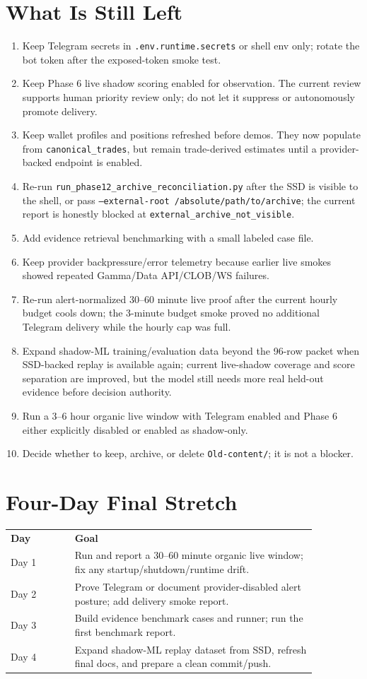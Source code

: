 \documentclass{article}
\begin{document}
\section*{What Is Still Left}
\begin{enumerate}[nosep]
\item Keep Telegram secrets in \texttt{.env.runtime.secrets} or shell env only; rotate the bot token after the exposed-token smoke test.
\item Keep Phase 6 live shadow scoring enabled for observation. The current review supports human priority review only; do not let it suppress or autonomously promote delivery.
\item Keep wallet profiles and positions refreshed before demos. They now populate from \texttt{canonical\_trades}, but remain trade-derived estimates until a provider-backed endpoint is enabled.
\item Re-run \texttt{run\_phase12\_archive\_reconciliation.py} after the SSD is visible to the shell, or pass \texttt{--external-root /absolute/path/to/archive}; the current report is honestly blocked at \texttt{external\_archive\_not\_visible}.
\item Add evidence retrieval benchmarking with a small labeled case file.
\item Keep provider backpressure/error telemetry because earlier live smokes showed repeated Gamma/Data API/CLOB/WS failures.
\item Re-run alert-normalized 30--60 minute live proof after the current hourly budget cools down; the 3-minute budget smoke proved no additional Telegram delivery while the hourly cap was full.
\item Expand shadow-ML training/evaluation data beyond the 96-row packet when SSD-backed replay is available again; current live-shadow coverage and score separation are improved, but the model still needs more real held-out evidence before decision authority.
\item Run a 3--6 hour organic live window with Telegram enabled and Phase 6 either explicitly disabled or enabled as shadow-only.
\item Decide whether to keep, archive, or delete \texttt{Old-content/}; it is not a blocker.
\end{enumerate}

\section*{Four-Day Final Stretch}
\begin{longtable}{p{0.18\linewidth}p{0.68\linewidth}}
\textbf{Day} & \textbf{Goal} \\
Day 1 & Run and report a 30--60 minute organic live window; fix any startup/shutdown/runtime drift. \\
Day 2 & Prove Telegram or document provider-disabled alert posture; add delivery smoke report. \\
Day 3 & Build evidence benchmark cases and runner; run the first benchmark report. \\
Day 4 & Expand shadow-ML replay dataset from SSD, refresh final docs, and prepare a clean commit/push. \\
\end{longtable}
\end{document}
